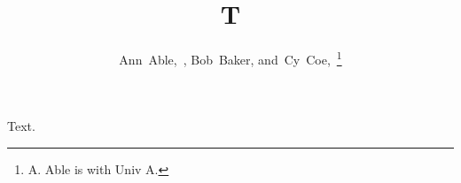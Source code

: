 \documentclass[journal]{IEEEtran}
\title{T}
\author{Ann~Able,~\IEEEmembership{Member,~IEEE}, Bob~Baker, and~Cy~Coe,~\IEEEmembership{Fellow,~IEEE}\thanks{A. Able is with Univ A.}}
\begin{document}
\maketitle
Text.
\end{document}
